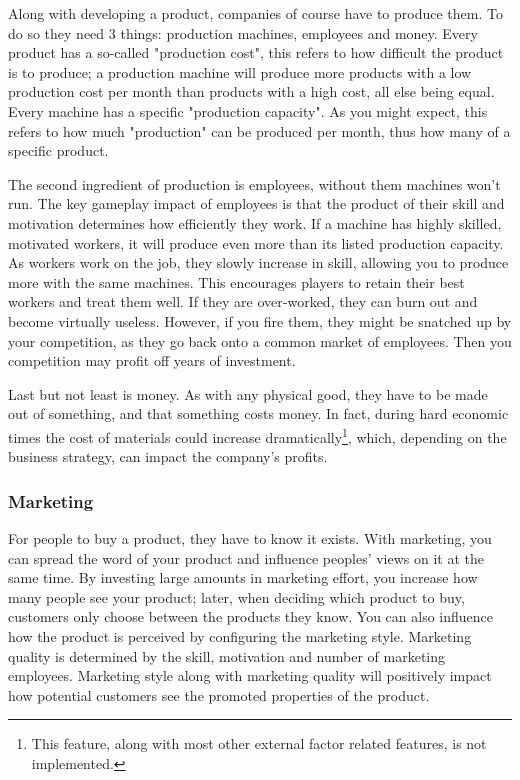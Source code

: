 Along with developing a product, companies of course have to produce them. To do so they need 3 things: production
machines, employees and money. Every product has a so-called "production cost", this refers to how difficult the
product is to produce; a production machine will produce more products with a low production cost per month than products with a
high cost, all else being equal. Every machine has a specific "production capacity". As you might expect, this refers to
how much "production" can be produced per month, thus how many of a specific product.

The second ingredient of production is employees, without them machines won't run. The key gameplay impact of employees
is that the product of their skill and motivation determines how efficiently they work. If
a machine has highly skilled, motivated workers, it will produce even more than its listed production capacity. As workers
work on the job, they slowly increase in skill, allowing you to produce more with the same machines. This
encourages players to retain their best workers and treat them well. If they are over-worked, they can burn out and
become virtually useless. However, if you fire them, they might be snatched up by your competition, as they go back onto
a common market of employees. Then you competition may profit off years of investment.

Last but not least is money. As with any physical good, they have to be made out of something, and that something costs
money. In fact, during hard economic times the cost of materials could increase dramatically\footnote{This feature, along
	with most other external factor related features, is not implemented.}, which, depending on the business strategy, can
impact the company's profits.

\subsubsection{Marketing}

For people to buy a product, they have to know it exists. With marketing, you can spread the word of your product and
influence peoples' views on it at the same time. By investing large amounts in marketing effort, you increase how many
people see your product; later, when deciding which product to buy, customers only choose between the products they
know. You can also influence how the product is perceived by configuring the marketing style. Marketing
quality is determined by the skill, motivation and number of marketing employees. Marketing style along with
marketing quality will positively impact how potential customers see the promoted properties of the product.

